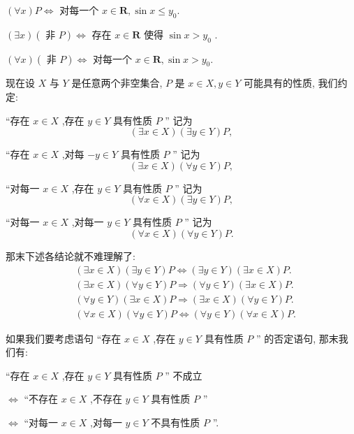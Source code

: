 $\left( {\forall x}\right) P \Leftrightarrow$ 对每一个 $x \in  \mathbf{R},\sin x \leq  {y}_{0}.$

$\left( {\exists x}\right) \left( {\text{ 非 }P}\right)  \Leftrightarrow$ 存在 $x \in  \mathbf{R}$ 使得 $\sin x > {y}_{0}$ .

$\left( {\forall x}\right) \left( {\text{ 非 }P}\right)  \Leftrightarrow$ 对每一个 $x \in  \mathbf{R},\sin x > {y}_{0}.$

现在设 $X$ 与 $Y$ 是任意两个非空集合, $P$ 是 $x \in  X,y \in  Y$ 可能具有的性质, 我们约定:

“存在 $x \in  X$ ,存在 $y \in  Y$ 具有性质 $P$ ” 记为
$$\left( {\exists x \in  X}\right) \left( {\exists y \in  Y}\right) P,$$

“存在 $x \in  X$ ,对每 $- y \in  Y$ 具有性质 $P$ ” 记为
$$\left( {\exists x \in  X}\right) \left( {\forall y \in  Y}\right) P,$$

“对每一 $x \in  X$ ,存在 $y \in  Y$ 具有性质 $P$ ” 记为
$$\left( {\forall x \in  X}\right) \left( {\exists y \in  Y}\right) P,$$

“对每一 $x \in  X$ ,对每一 $y \in  Y$ 具有性质 $P$ ” 记为
$$\left( {\forall x \in  X}\right) \left( {\forall y \in  Y}\right) P.$$

那末下述各结论就不难理解了:
\begin{align*}
	&\left( {\exists x \in  X}\right) \left( {\exists y \in  Y}\right) P \Leftrightarrow  \left( {\exists y \in  Y}\right) \left( {\exists x \in  X}\right) P.\\
	&\left( {\exists x \in  X}\right) \left( {\forall y \in  Y}\right) P \Rightarrow  \left( {\forall y \in  Y}\right) \left( {\exists x \in  X}\right) P.\\
	&\left( {\forall y \in  Y}\right) \left( {\exists x \in  X}\right) P \Rightarrow  \left( {\exists x \in  X}\right) \left( {\forall y \in  Y}\right) P.\\
	&\left( {\forall x \in  X}\right) \left( {\forall y \in  Y}\right) P \Leftrightarrow  \left( {\forall y \in  Y}\right) \left( {\forall x \in  X}\right) P.
\end{align*}

如果我们要考虑语句 “存在 $x \in  X$ ,存在 $y \in  Y$ 具有性质 $P$ ” 的否定语句, 那末我们有:

“存在 $x \in  X$ ,存在 $y \in  Y$ 具有性质 $P$ ” 不成立

$\Leftrightarrow$ “不存在 $x \in  X$ ,不存在 $y \in  Y$ 具有性质 $P$ ”

$\Leftrightarrow$ “对每一 $x \in  X$ ,对每一 $y \in  Y$ 不具有性质 $P$ ”.

